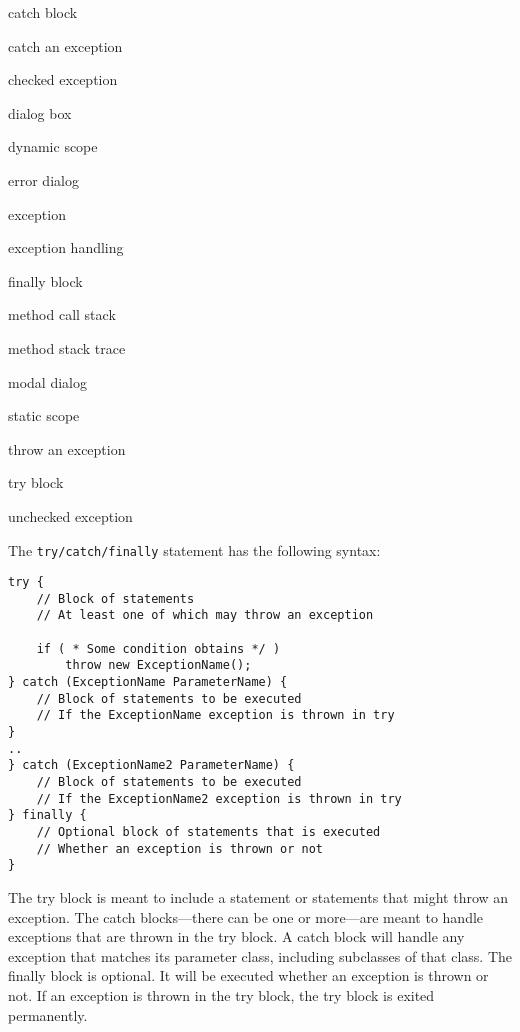 \begin{KT}
catch block

catch an exception

checked exception

dialog box

dynamic scope

error dialog

exception

exception handling

finally block

method call stack

method stack trace

modal dialog

static scope

throw an exception

try block

unchecked exception

\end{KT}


\noindent The {\tt try/catch/finally} statement has the following syntax:

\begin{jjjlisting}
\begin{lstlisting}
try {
    // Block of statements
    // At least one of which may throw an exception

    if ( * Some condition obtains */ )
        throw new ExceptionName();
} catch (ExceptionName ParameterName) {
    // Block of statements to be executed
    // If the ExceptionName exception is thrown in try
}
..
} catch (ExceptionName2 ParameterName) {
    // Block of statements to be executed
    // If the ExceptionName2 exception is thrown in try
} finally {
    // Optional block of statements that is executed
    // Whether an exception is thrown or not
}
\end{lstlisting}
\end{jjjlisting}

\noindent The try block is meant to include a statement or
statements that might throw an exception.  The catch blocks---there
can be one or more---are meant to handle exceptions that are thrown
in the try block.  A catch block will handle any exception that
matches its parameter class, including subclasses of that class.
The finally block is optional.  It will be executed whether
an exception is thrown or not.  If an exception is thrown in
the try block, the try block is exited permanently.

